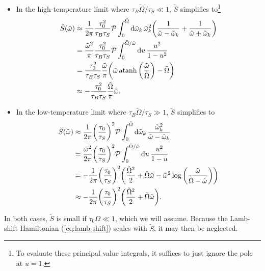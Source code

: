 \documentclass[../thesis.tex]{subfiles}
\begin{document}
\begin{itemize}
  \item In the high-temperature limit where $\tau_B\tilde{\Omega} / \tau_S \ll
    1$, $\tilde{S}$ simplifies to\footnote{%
      To evaluate these principal value integrals, it suffices to just ignore
      the pole at $u = 1$.
    }
    \begin{align}
      \tilde{S}(\tilde{\omega})
      &\approx \frac{1}{2\pi} \frac{\tau_0^2}{\tau_B\tau_S}
      \pv\int_0^{\tilde{\Omega}} \dd{\tilde{\omega}_k} \tilde{\omega}_k^2
      \qty(\frac{1}{\tilde{\omega} - \tilde{\omega}_k}
      + \frac{1}{\tilde{\omega} + \tilde{\omega}_k}) \\
      &= \frac{\tilde{\omega}^2}{\pi} \frac{\tau_0^2}{\tau_B\tau_S}
      \pv\int_0^{\tilde{\Omega} / \tilde{\omega}} \dd{u}
      \frac{u^2}{1 - u^2} \\
      &= \frac{\tau_0^2}{\tau_B\tau_S} \frac{\tilde{\omega}}{\pi}
      \qty(\tilde{\omega}\atanh\qty(\frac{\tilde{\omega}}{\tilde{\Omega}})
      - \tilde{\Omega}) \\
      &\approx -\frac{\tau_0^2}{\tau_B\tau_S}
      \frac{\tilde{\Omega}}{\pi}\tilde{\omega}.
    \end{align}

  \item In the low-temperature limit where $\tau_B\tilde{\Omega} / \tau_S \gg
    1$, $\tilde{S}$ simplifies to
    \begin{align}
      \tilde{S}(\tilde{\omega})
      &\approx \frac{1}{2\pi} {\qty(\frac{\tau_0}{\tau_S})}^2
      \pv\int_0^{\tilde{\Omega}} \dd{\tilde{\omega}_k}
      \frac{\tilde{\omega}_k^2}{\tilde{\omega} - \tilde{\omega}_k} \\
      &= \frac{\tilde{\omega}^2}{2\pi} {\qty(\frac{\tau_0}{\tau_S})}^2
      \pv\int_0^{\tilde{\Omega} / \tilde{\omega}} \dd{u}
      \frac{u^2}{1 - u} \\
      &= -\frac{1}{2\pi} {\qty(\frac{\tau_0}{\tau_S})}^2 \qty(%
      \frac{\tilde{\Omega}^2}{2} + \tilde{\Omega}\tilde{\omega} -
      \tilde{\omega}^2
      \log\qty(\frac{\tilde{\omega}}{\tilde{\Omega} - \tilde{\omega}})
      ) \\
      &\approx -\frac{1}{2\pi} {\qty(\frac{\tau_0}{\tau_S})}^2 \qty(%
      \frac{\tilde{\Omega}^2}{2} + \tilde{\Omega}\tilde{\omega}
      ).
    \end{align}
\end{itemize}
In both cases, $\tilde{S}$ is small if $\tau_0\Omega \ll 1$, which we will
assume. Because the Lamb-shift Hamiltonian (\cref{eq:lamb-shift}) scales with
$\tilde{S}$, it may then be neglected.
\end{document}
